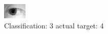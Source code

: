 \begin{figure}[h!]
\begin{center}
\includegraphics[width=0.60\columnwidth]{figures/ID1247_class_3_target_4.png}
\end{center}
\caption{ Classification: 3 actual target: 4}
\label{fig:ID1247_class_3_target_4}
\end{figure}
